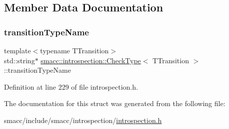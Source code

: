 \subsection{Member Data Documentation}
\mbox{\label{structsmacc_1_1introspection_1_1CheckType_a0b356fd5975fa8f359f4e47f9ac8debf}} 
\subsubsection{\texorpdfstring{transition\+Type\+Name}{transitionTypeName}}
{\footnotesize\ttfamily template$<$typename T\+Transition$>$ \\
std\+::string$\ast$ \hyperlink{structsmacc_1_1introspection_1_1CheckType}{smacc\+::introspection\+::\+Check\+Type}$<$ T\+Transition $>$\+::transition\+Type\+Name}



Definition at line 229 of file introspection.\+h.



The documentation for this struct was generated from the following file\+:\begin{DoxyCompactItemize}
\item 
smacc/include/smacc/introspection/\hyperlink{introspection_8h}{introspection.\+h}\end{DoxyCompactItemize}
